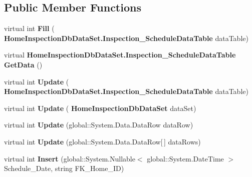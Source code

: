 \subsection*{Public Member Functions}
\begin{DoxyCompactItemize}
\item 
\mbox{\label{class_a_f_h___scheduler_1_1_home_inspection_db_data_set_table_adapters_1_1_inspection___schedule_table_adapter_a2da45038988c985529da01a3380cc024}} 
virtual int {\bfseries Fill} (\textbf{ Home\+Inspection\+Db\+Data\+Set.\+Inspection\+\_\+\+Schedule\+Data\+Table} data\+Table)
\item 
\mbox{\label{class_a_f_h___scheduler_1_1_home_inspection_db_data_set_table_adapters_1_1_inspection___schedule_table_adapter_a14f024125287f8a67b4dc77cbd29198e}} 
virtual \textbf{ Home\+Inspection\+Db\+Data\+Set.\+Inspection\+\_\+\+Schedule\+Data\+Table} {\bfseries Get\+Data} ()
\item 
\mbox{\label{class_a_f_h___scheduler_1_1_home_inspection_db_data_set_table_adapters_1_1_inspection___schedule_table_adapter_af1b17d7c383a85c491f9b6f36092e354}} 
virtual int {\bfseries Update} (\textbf{ Home\+Inspection\+Db\+Data\+Set.\+Inspection\+\_\+\+Schedule\+Data\+Table} data\+Table)
\item 
\mbox{\label{class_a_f_h___scheduler_1_1_home_inspection_db_data_set_table_adapters_1_1_inspection___schedule_table_adapter_aa847f841844b824b3fcb630ab449928f}} 
virtual int {\bfseries Update} (\textbf{ Home\+Inspection\+Db\+Data\+Set} data\+Set)
\item 
\mbox{\label{class_a_f_h___scheduler_1_1_home_inspection_db_data_set_table_adapters_1_1_inspection___schedule_table_adapter_a3d45ab9c4ddfcb9ee4a9f5f7a2bd489b}} 
virtual int {\bfseries Update} (global\+::\+System.\+Data.\+Data\+Row data\+Row)
\item 
\mbox{\label{class_a_f_h___scheduler_1_1_home_inspection_db_data_set_table_adapters_1_1_inspection___schedule_table_adapter_a1ea92f006263af71a96091c44044758d}} 
virtual int {\bfseries Update} (global\+::\+System.\+Data.\+Data\+Row[$\,$] data\+Rows)
\item 
\mbox{\label{class_a_f_h___scheduler_1_1_home_inspection_db_data_set_table_adapters_1_1_inspection___schedule_table_adapter_a81a36b29f3b01715d4b3cf853b2045be}} 
virtual int {\bfseries Insert} (global\+::\+System.\+Nullable$<$ global\+::\+System.\+Date\+Time $>$ Schedule\+\_\+\+Date, string F\+K\+\_\+\+Home\+\_\+\+ID)
\end{DoxyCompactItemize}
